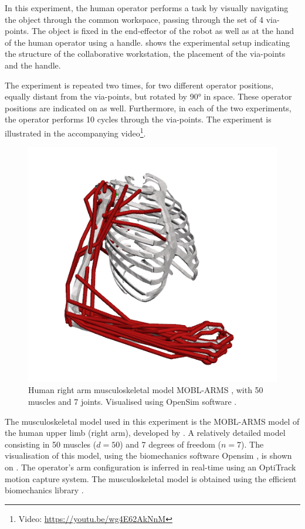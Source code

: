 In this experiment, the human operator performs a task by {visually} navigating the object through the common workspace, passing through {the set of} 4 via-points. The object is fixed in the end-effector of the robot as well as at the hand of the human operator using a handle.  shows the experimental setup indicating the structure of the collaborative workstation, the placement of the via-points and the handle. 

The experiment is repeated two times, for two different operator positions, equally distant from the via-points, but rotated by 90° in space. These operator positions are indicated on  as well. Furthermore, in each of the two experiments, the operator performs 10 cycles through the via-points. The experiment is illustrated in the accompanying video\footnote{Video: \url{https://youtu.be/wg4E62AkNnM}}.



\begin{figure}
\vspace{-0.5cm}
    \centering
    \includegraphics[width=\linewidth]{Papers/images/model_50m7dof.png}
    \caption{Human right arm musculoskeletal model MOBL-ARMS \cite{saul2015benchmarking}, with 50 muscles and 7 joints. Visualised using OpenSim software \cite{opensim}.  }
    \label{fig:model_musc}
\end{figure}
The musculoskeletal model used in this experiment is the MOBL-ARMS model \cite{saul2015benchmarking} of the human upper limb (right arm), developed by \citet{holzbaur2005model}. A relatively detailed model consisting in 50 muscles ($d=50$) and 7 degrees of freedom ($n=7$). The visualisation of this model, using the biomechanics software Opensim \cite{opensim}, is shown on .
The operator's arm configuration is inferred in real-time using an OptiTrack~\cite{optitrack} motion capture system. The musculoskeletal model is obtained using the efficient biomechanics library  \cite{Michaud2021}. 

